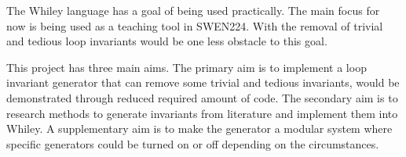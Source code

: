 \documentclass[11pt, a4paper, twoside, openright]{report}
\begin{document}

The Whiley language has a goal of being used practically.
The main focus for now is being used as a teaching tool in SWEN224.
With the removal of trivial and tedious loop invariants would be one 
less obstacle to this goal.


This project has three main aims.
The primary aim is to implement a loop invariant generator that can remove
some trivial and tedious invariants, would be demonstrated through reduced required
amount of code.
The secondary aim is to research methods to generate invariants from literature 
and implement them into Whiley.
A supplementary aim is to make the generator a modular system where specific generators
could be turned on or off depending on the circumstances.

%
%
%
%
\end{document}
